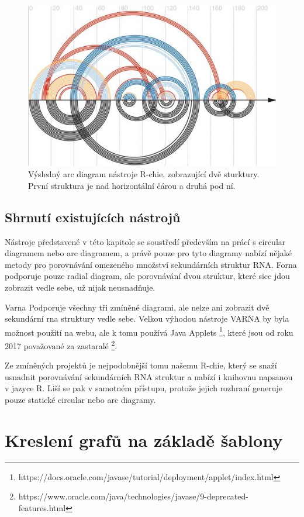 \begin{figure}[H]
  \centering
  \includegraphics[width=140mm]{../img/kap01/rchie.jpeg}
  \caption{Výsledný arc diagram nástroje R-chie, zobrazující dvě sturktury.
  První struktura je nad horizontální čárou a druhá pod ní.}
\end{figure}

\subsection{Shrnutí existujících nástrojů}

Nástroje představené v této kapitole se soustředí především na prácí s circular
diagramem nebo arc diagramem, a právě pouze pro tyto diagramy nabízí nějaké
metody pro porovnávání omezeného množství sekundárních struktur RNA. Forna
podporuje pouze radial diagram, ale porovnávání dvou struktur, které sice jdou
zobrazit vedle sebe, už nijak neusnadňuje. 

Varna Podporuje všechny tři zmíněné diagrami, ale nelze ani zobrazit dvě
sekundární rna struktury vedle sebe. Velkou výhodou nástroje VARNA by byla
možnost použití na webu, ale k tomu používá Java Applets
\footnote{https://docs.oracle.com/javase/tutorial/deployment/applet/index.html},
které jsou od roku 2017 považované za zastaralé
\footnote{https://www.oracle.com/java/technologies/javase/9-deprecated-features.html}.

Ze zmíněných projektů je nejpodobnější tomu našemu R-chie, který se snaží
usnadnit porovnávání sekundárních RNA struktur a nabízí i knihovnu napsanou v
jazyce R. Liší se pak v samotném přístupu, protože jejich rozhraní generuje
pouze statické circular nebo arc diagramy.

\section{Kreslení grafů na základě šablony}

